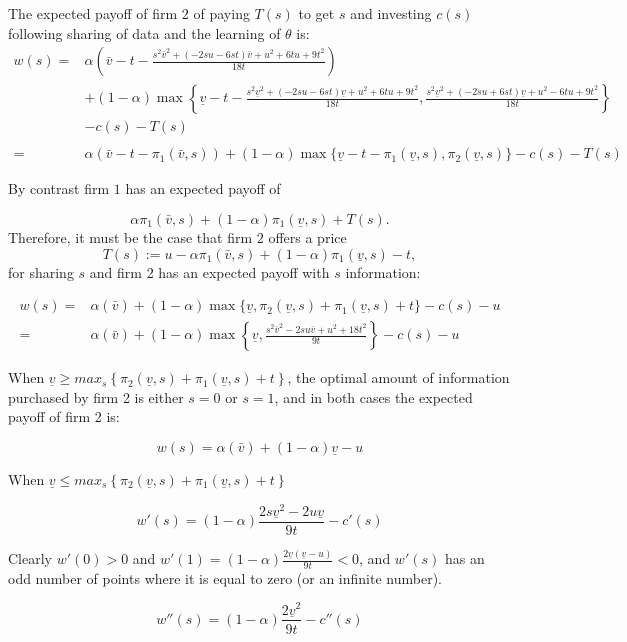 \documentclass[a4paper,leqno]{article}%
\renewcommand{\t}{\theta}
\renewcommand{\a}{\alpha}
\newcommand{\uv}{\underline v}
\newcommand{\ov}{\bar v}
\begin{document}
The expected payoff of firm $2$ of paying $T(s)$ to get $s$ and investing $c(s)$ following sharing of data and the learning of $\t$ is:
%
\begin{equation}
    \begin{aligned}
w(s)=&\a\left(\ov-t-\frac{s^2\ov^2+(-2su-6st)\ov+u^2+6tu+9t^2}{18t}\right)\\
    &+(1-\a)\max \left\{\uv-t-\frac{s^2\uv^2+(-2su-6st)\uv+u^2+6tu+9t^2}{18t},\frac{s^2\uv^2+(-2su+6st)\uv+u^2-6tu+9t^2}{18t}\right\}\\
    &-c(s)-T(s)\\
\\
    =&\a\left(\ov-t-\pi_1(\ov,s)\right)+(1-\a)\max\{\uv-t-\pi_1(\uv,s),\pi_2(\uv,s)\}-c(s)-T(s)
\end{aligned}
\end{equation}

By contrast firm $1$ has an expected payoff of 

\begin{equation}\label{value-merger-firm1}
    \a\pi_1(\ov,s)+(1-\a)\pi_1(\uv,s)+T(s).
\end{equation}
%
Therefore, it must be the case that firm $2$ offers a price
%
\[
T(s):=u-\a\pi_1(\ov,s)+(1-\a)\pi_1(\uv,s)-t,
\]
%
for sharing $s$ and firm 2 has an expected payoff with $s$ information:


\begin{equation}
    \begin{aligned}
w(s)=&\a(\ov)+(1-\a)\max\{\uv,\pi_2(\uv,s)+\pi_1(\uv,s)+t\}-c(s)-u\\
    =&\a(\ov)+(1-\a)\max\left\{\uv,\frac{s^2\ov^2-2su\ov+u^2+18t^2}{9t}\right\}-c(s)-u
\end{aligned}
\end{equation}

When $\uv\geq max_s\left\{\pi_2(\uv,s)+\pi_1(\uv,s)+t\right\}$, the optimal amount of information purchased by firm 2 is either $s=0$ or $s=1$, and in both cases the expected payoff of firm 2 is:

\[
w(s)=\a(\ov)+(1-\a)\uv-u
\]

When $\uv\leq max_s\left\{\pi_2(\uv,s)+\pi_1(\uv,s)+t\right\}$


\[
w'(s)=(1-\a)\frac{2s\uv^2-2u\uv}{9t}-c'(s)
\]

Clearly $w'(0)>0$ and $w'(1)=(1-\a)\frac{2\uv(\uv-u)}{9t}<0$, and $w'(s)$ has an odd number of points where it is equal to zero (or an infinite number).

\[
w''(s)=(1-\a)\frac{2\uv^2}{9t}-c''(s)
\]
\end{document}
